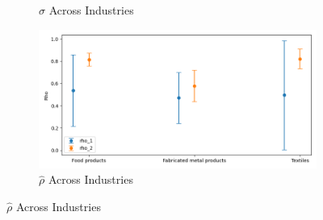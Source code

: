 \documentclass{article}
\begin{document}
\begin{figure}[ht!]
\begin{subfigure}[t]{0.32\textwidth}
        \caption{$\hat\sigma$ Across Industries}
    \end{subfigure}
    \begin{subfigure}[t]{0.32\textwidth}
        \centering
        \includegraphics[width=\textwidth]{figure/ar1_normal_rho_across_industries.png}
        \caption{$\hat\rho$ Across Industries}
    \end{subfigure}
\end{figure}
\end{document}
